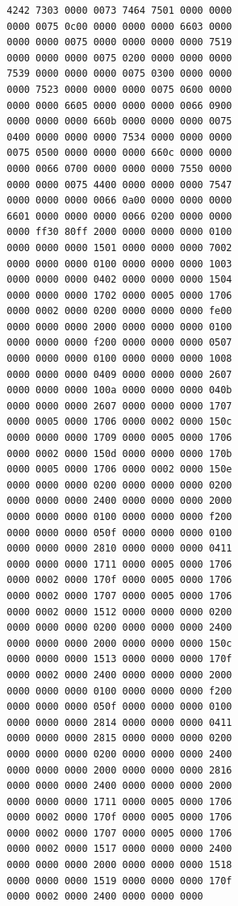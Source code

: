 \documentclass{report}
\begin{document}
\begin{mdframed}[style=cl]
\begin{verbatim}
  4242 7303 0000 0073 7464 7501 0000 0000
  0000 0075 0c00 0000 0000 0000 6603 0000
  0000 0000 0075 0000 0000 0000 0000 7519
  0000 0000 0000 0075 0200 0000 0000 0000
  7539 0000 0000 0000 0075 0300 0000 0000
  0000 7523 0000 0000 0000 0075 0600 0000
  0000 0000 6605 0000 0000 0000 0066 0900
  0000 0000 0000 660b 0000 0000 0000 0075
  0400 0000 0000 0000 7534 0000 0000 0000
  0075 0500 0000 0000 0000 660c 0000 0000
  0000 0066 0700 0000 0000 0000 7550 0000
  0000 0000 0075 4400 0000 0000 0000 7547
  0000 0000 0000 0066 0a00 0000 0000 0000
  6601 0000 0000 0000 0066 0200 0000 0000
  0000 ff30 80ff 2000 0000 0000 0000 0100
  0000 0000 0000 1501 0000 0000 0000 7002
  0000 0000 0000 0100 0000 0000 0000 1003
  0000 0000 0000 0402 0000 0000 0000 1504
  0000 0000 0000 1702 0000 0005 0000 1706
  0000 0002 0000 0200 0000 0000 0000 fe00
  0000 0000 0000 2000 0000 0000 0000 0100
  0000 0000 0000 f200 0000 0000 0000 0507
  0000 0000 0000 0100 0000 0000 0000 1008
  0000 0000 0000 0409 0000 0000 0000 2607
  0000 0000 0000 100a 0000 0000 0000 040b
  0000 0000 0000 2607 0000 0000 0000 1707
  0000 0005 0000 1706 0000 0002 0000 150c
  0000 0000 0000 1709 0000 0005 0000 1706
  0000 0002 0000 150d 0000 0000 0000 170b
  0000 0005 0000 1706 0000 0002 0000 150e
  0000 0000 0000 0200 0000 0000 0000 0200
  0000 0000 0000 2400 0000 0000 0000 2000
  0000 0000 0000 0100 0000 0000 0000 f200
  0000 0000 0000 050f 0000 0000 0000 0100
  0000 0000 0000 2810 0000 0000 0000 0411
  0000 0000 0000 1711 0000 0005 0000 1706
  0000 0002 0000 170f 0000 0005 0000 1706
  0000 0002 0000 1707 0000 0005 0000 1706
  0000 0002 0000 1512 0000 0000 0000 0200
  0000 0000 0000 0200 0000 0000 0000 2400
  0000 0000 0000 2000 0000 0000 0000 150c
  0000 0000 0000 1513 0000 0000 0000 170f
  0000 0002 0000 2400 0000 0000 0000 2000
  0000 0000 0000 0100 0000 0000 0000 f200
  0000 0000 0000 050f 0000 0000 0000 0100
  0000 0000 0000 2814 0000 0000 0000 0411
  0000 0000 0000 2815 0000 0000 0000 0200
  0000 0000 0000 0200 0000 0000 0000 2400
  0000 0000 0000 2000 0000 0000 0000 2816
  0000 0000 0000 2400 0000 0000 0000 2000
  0000 0000 0000 1711 0000 0005 0000 1706
  0000 0002 0000 170f 0000 0005 0000 1706
  0000 0002 0000 1707 0000 0005 0000 1706
  0000 0002 0000 1517 0000 0000 0000 2400
  0000 0000 0000 2000 0000 0000 0000 1518
  0000 0000 0000 1519 0000 0000 0000 170f
  0000 0002 0000 2400 0000 0000 0000
\end{verbatim}
\end{mdframed}
\end{document}
